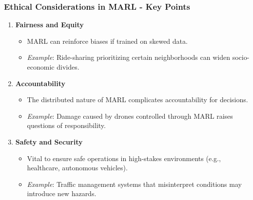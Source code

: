 \documentclass[aspectratio=169]{beamer}
\begin{document}
\begin{frame}[fragile]
  \frametitle{Ethical Considerations in MARL - Key Points}
  \begin{enumerate}
    \item \textbf{Fairness and Equity}
      \begin{itemize}
        \item MARL can reinforce biases if trained on skewed data.
        \item \textit{Example}: Ride-sharing prioritizing certain neighborhoods can widen socio-economic divides.
      \end{itemize}

    \item \textbf{Accountability}
      \begin{itemize}
        \item The distributed nature of MARL complicates accountability for decisions.
        \item \textit{Example}: Damage caused by drones controlled through MARL raises questions of responsibility.
      \end{itemize}

    \item \textbf{Safety and Security}
      \begin{itemize}
        \item Vital to ensure safe operations in high-stakes environments (e.g., healthcare, autonomous vehicles).
        \item \textit{Example}: Traffic management systems that misinterpret conditions may introduce new hazards.
      \end{itemize}
  \end{enumerate}
\end{frame}
\end{document}
